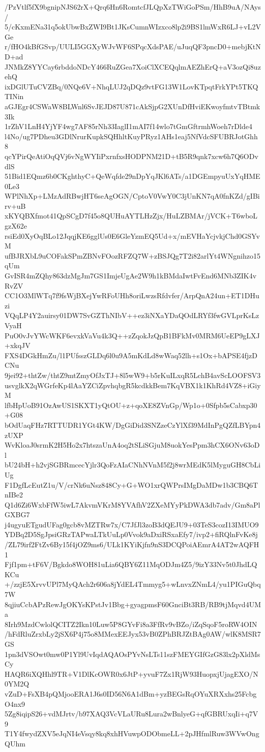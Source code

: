 /PzVtlf5fX9bgnipNJS62rX+Qrq6Hn6RomtcfJLQpXzTWiGoPSm/HhB9uA/NAys/
5/cKxmENa31q5okUbwBxZWI9Bt1JKsCumnWIzxco8lp2i9BS1lmWxR6LJ+vL2VGe
r/fHO4kBfGSvp/UULI5GGXyWJvWF6SPqcXdsPAE/uJuqQF3pncD0+mebjKtND+ad
JNMkZ8YYCay6rbddoNDcY466RuZGea7XoiClXCEQqlmAEZhErQ+aV3ozQi8uzehQ
ixDGlUTuCVZBq/0NQe6V+NhqLUJ2qDQz9vtFG13W1LovKTpqtFrkYPt5TKQTINin
aGJEgr4CSWaW8BLWnl6SvJEJD87U871cAkSjpG2XUnDfHviEKwoyfmtvTBtmk3Ik
1rZhV1LnH4YjYF4wg7AF85rNh33IaglI1mAI7f14wlo7tGmGftrmhWoeh7rDlde4
l4No/ug7PDheu3GDlNrurKupkSQHhltKuyPRyz1AHs1eaj5NfVdcSFUBRJotGhh8
qcYPirQeAtiOqQVj6vNgWYIiPxrnfxsHODPNM21D+tB5R9qnk7xcw6h7Q6ODvdlS
51Bid1EQmz6b0CKghthyC+QeWqfde29nDpYqJKl6ATs/a1DGEmpyuUxYqHME0Le3
WPlNhXp+LMzAdRBwjHT6seAgOGN/CptoV0VwY0C3jUnKN7qA0fnKZd/gIBirv+uB
xKYQBXfmot41QpSCgD7f45o8QUHuAYTLHzZjx/HuLZBMAr/jVCK+T6wboLgzX62e
rsiEd0XyOqBLo12JqqjKE6gglUs0E6GleYzmEQ5Ud+x/mEVHaYcjvkjChd0GSYvM
ufBJRXbL9uCOFakSPmZBNvFOozRFZQ7W+zBSJQg7T2i82arlYt4WNgnihzo15qUm
GvISR4mZQhy863dzMgJm7GS1ImjeUgAe2W9h1kBMdaIwtFvEnd6MNb3ZIK4vRvZV
CC1O3MlWTq7f9fsWjBXejYwRFoUHh8oriLwzsRfdvfer/ArpQnA24un+ET1DHuzi
VQqLP4Y2auirsy01DW7SvGZThNIbV++ez3iNXaYDaQOdLRYf3fwGVLprKsLzVyaH
PuO0vJvYWcWKF6evxkVaVu4k3Q++zZqokJzQpB1BFkMv0MRM6UeEP9gLXJ+xkqJV
FXS4DGkHmZu/l1PUfsszGLDq6l0u9A5mKdLd8wWaq52lh+s1Ox+bAPSE4fjzDCNu
9jei92+thtZw/thtZ9mtZmyOfJxTJ+8l5wW9+b5rKuILxqR5LchB4avScLOOFSV3
usvglkX2qWGrfeKp4lAaYZCiZpvhqbgR5kcdkkBem7KqVBX1k1KhRd4VZ8+iGiyM
lfbHpUoB91OzAwUS1SKXT1yQtOU+z+qoXE8ZVnGp/Wp1o+0Sfpb5sCabxp30+G08
bOdUaqFHz7RTTUDR1YGt4KW/DgGiDid3SNZzeCzYlXf39MdInPgQZfLBYpn4zUXP
WvKloaJ0srmK2H5Ho2x7htszaUnA4oq2tSLiSGjuM8uokYesPpm3hCX6ONv63oDl
bU24bH+h2vjSGBRmcecYjlr3QoFzAIaCNhNVnM5f2j8wrMEdK5lMyguGH8CbLiUg
F1DgfLcEutZ1u/V/crNk6uNsz848Cy+G+WO1xrQWPrsIMgDaMDw1b3CBQ6TnIBe2
Q1d6Zi6WxbFfW5iwL7AkvmVKrM8YVAfhV2ZXeMYyPkDWA3db7adv/Gm8aPlGXBG7
j4ugyuETgudUFag0gcb8vMZTRw7x/C7JfJl3zoB3dQEJU9+03TeS3cozI13IMUO9
YDBq2D5SgJpsiGRzTAPwaLTkUuLp0Vvok9aDxiRSxaEfy7/ivp2+fiRQlnFvKe8j
/ZL79irf2FtZv6By15f4jOZ9ms6/ULk1KYiKjfn9nS3DCQPoiAEmrA4AT2wAQFH1
Fjf1pm+tF6V/Bgkdo8WOH81uLia6QBY6Z11MqODJm4Z5/9izY33Nv5t0JhdLQKCu
+/zzjE5XrvvUPl7MyQAch2r606a8jYdEL4Tmmyg5+wLnvxZNmL4/yu1PIGuQbq7W
8qjiuCcbAPzRewJgOKYsKPstJv1Bbg+gyagpmsF60GnciBt3RB/RB9tjMqvd4UMa
8Irh9MzdCwlolQCITZ2Ikn10Luw5P8GYvFi8a3FfRv9vBZo/iZqSqoF5roRW4OIN
/hFdRluZrxbLy2jSX6P4j75o8MMexEEJyx53vB0ZPhBRJZtBAg0AW/wlK8MSR7GS
1pn3dVSOwt0mw0P1Yl9UvIqdAQAOsPYvNsLTs11szFMEYGIfGzG83lx2pXldMsCy
HAQR6iXQHhl9TR+V1DlKcOWR0x6JtP+yvuF7Zx1RjW93HuopxjUjagEXO/N0YM2Q
vZuD+FsXB4pQMjooERA1J6s0ID56N6A1dBm+yzBEGsRqOYuXRXxhs25FcbgO4nx9
5Zg8iqipS26+vdMJrtv/b97XAQ3VcVLaURu8Lura2wBnlyeG+qfGBRUxqIi+q7V9
T1Y4fwydZXV5eJqNI4eVsqy8kq8xhHVuwpODObmeLL+2pJHfmlRuw3WVwOngQUhm
